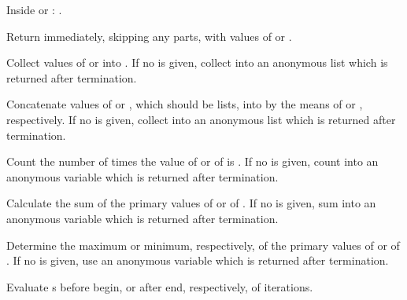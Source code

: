\begin{LIST}{1cm}
\begin{LIST}{.5cm}
    \begin{LIST}{.5cm}
      {
        Inside  or :
        .
      }
    \end{LIST}

    {
      Return immediately, skipping any  parts, with
      values of  or .
    }

    {
      Collect values of  or  into . If no
       is given, collect into an anonymous list which is
      returned after termination.
    }

    {
      Concatenate values of  or , which should be
      lists, into  by the means of  or ,
      respectively.  If no  is given, collect into an
      anonymous list which is returned after termination. 
    }

    {
      Count the number of times the value of  or of  is \T.
      If no  is given, count into an anonymous variable
      which is returned after termination.
    }

    {
      Calculate the sum of the primary values of  or of .
      If no  is given, sum into an anonymous variable
      which is returned after termination.
    }

    {
      Determine the maximum or minimum, respectively, of the primary values of
       or of . 
      If no  is given, use an anonymous variable
      which is returned after termination.
    }

    {
      Evaluate s before begin, or after end, respectively,
      of iterations.
    }


\end{LIST}
\end{LIST}
